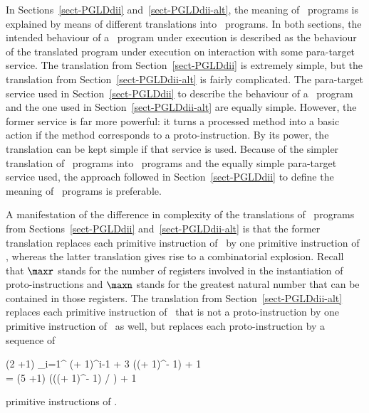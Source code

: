 \documentclass[fleqn]{llncs}
\begin{document}
In Sections~\ref{sect-PGLDdii} and~\ref{sect-PGLDdii-alt}, the meaning
of \PGLDdii\ programs is explained by means of different translations
into \PGLD\ programs.
In both sections, the intended behaviour of a \PGLDdii\ program under
execution is described as the behaviour of the translated program under
execution on interaction with some para-target service.
The translation from Section~\ref{sect-PGLDdii} is extremely simple,
but the translation from Section~\ref{sect-PGLDdii-alt} is fairly
complicated.
The para-target service used in Section~\ref{sect-PGLDdii} to describe
the behaviour of a \PGLDdii\ program and the one used in
Section~\ref{sect-PGLDdii-alt} are equally simple.
However, the former service is far more powerful: it turns a processed
method into a basic action if the method corresponds to a
proto-instruction.
By its power, the translation can be kept simple if that service is
used.
Because of the simpler translation of \PGLDdii\ programs into \PGLD\
programs and the equally simple para-target service used, the approach
followed in Section~\ref{sect-PGLDdii} to define the meaning of
\PGLDdii\ programs is preferable.

A manifestation of the difference in complexity of the translations of
\PGLDdii\ programs from Sections~\ref{sect-PGLDdii}
and~\ref{sect-PGLDdii-alt} is that the former translation replaces each
primitive instruction of \PGLDdii\ by one primitive instruction of
\PGLD, whereas the latter translation gives rise to a combinatorial
explosion.
Recall that $\maxr$ stands for the number of registers involved in the
instantiation of proto-instructions and $\maxn$ stands for the greatest
natural number that can be contained in those registers.
The translation from Section~\ref{sect-PGLDdii-alt} replaces each
primitive instruction of \PGLDdii\ that is not a proto-instruction by
one primitive instruction of \PGLD\ as well, but replaces each
proto-instruction by a sequence of
\begin{ldispl}
(2 \mul \maxn +1) \mul \sum_{i=1}^{\maxr} (\maxn + 1)^{i-1} +
 3 \mul ((\maxn + 1)^\maxr - 1) + 1
\\ \;\; {} =
 (5 \mul \maxn +1) \mul (((\maxn + 1)^\maxr - 1) / \maxn) + 1
\end{ldispl}primitive instructions of \PGLD.
\end{document}

